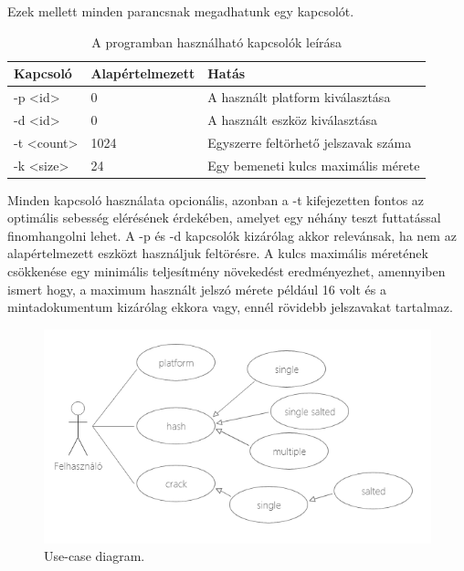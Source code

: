 \noindent Ezek mellett minden parancsnak megadhatunk egy kapcsolót.
%
\begin{table}[H]
\centering
    \begin{tabular}{|l|l|l|}
        \hline
        Kapcsoló                          & Alapértelmezett & Hatás                                          \\
        \hline
        -p \textless{}id\textgreater{}    & 0                     & A használt platform kiválasztása               \\
        \hline
        -d \textless{}id\textgreater{}    & 0                     & A használt eszköz kiválasztása                 \\
        \hline
        -t \textless{}count\textgreater{} & 1024                  & Egyszerre feltörhető jelszavak száma \\
        \hline
        -k \textless{}size\textgreater{}  & 24                    & Egy bemeneti kulcs maximális mérete \\
        \hline
    \end{tabular}
    \caption{A programban használható kapcsolók leírása}
\end{table}

Minden kapcsoló használata opcionális, azonban a -t kifejezetten fontos az optimális sebesség elérésének érdekében, amelyet egy néhány teszt futtatással finomhangolni lehet. A -p és -d kapcsolók kizárólag akkor relevánsak, ha nem az alapértelmezett eszközt használjuk feltörésre. A kulcs maximális méretének csökkenése egy minimális teljesítmény növekedést eredményezhet, amennyiben ismert hogy, a maximum használt jelszó mérete például 16 volt és a mintadokumentum kizárólag ekkora vagy, ennél rövidebb jelszavakat tartalmaz.

\begin{figure}[H]
    \centering
    \includegraphics[width=\textwidth]{images/diagrams/use-case.png}
    \caption{Use-case diagram.}
    \label{fig:use-case}
\end{figure}






